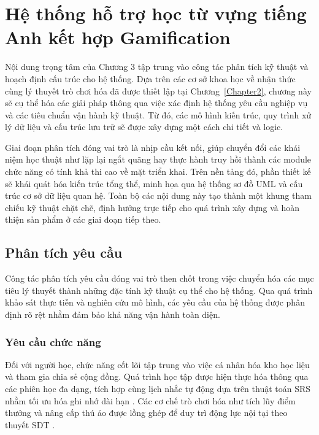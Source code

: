 ﻿\chapter{Hệ thống hỗ trợ học từ vựng tiếng Anh kết hợp Gamification}
\label{Chapter3}

Nội dung trọng tâm của Chương 3 tập trung vào công tác phân tích kỹ thuật và hoạch định cấu trúc cho hệ thống. Dựa trên các cơ sở khoa học về nhận thức cùng lý thuyết trò chơi hóa đã được thiết lập tại Chương~\ref{Chapter2}, chương này sẽ cụ thể hóa các giải pháp thông qua việc xác định hệ thống yêu cầu nghiệp vụ và các tiêu chuẩn vận hành kỹ thuật. Từ đó, các mô hình kiến trúc, quy trình xử lý dữ liệu và cấu trúc lưu trữ sẽ được xây dựng một cách chi tiết và logic.

Giai đoạn phân tích đóng vai trò là nhịp cầu kết nối, giúp chuyển đổi các khái niệm học thuật như lặp lại ngắt quãng hay thực hành truy hồi thành các module chức năng có tính khả thi cao về mặt triển khai. Trên nền tảng đó, phần thiết kế sẽ khái quát hóa kiến trúc tổng thể, minh họa qua hệ thống sơ đồ UML và cấu trúc cơ sở dữ liệu quan hệ. Toàn bộ các nội dung này tạo thành một khung tham chiếu kỹ thuật chặt chẽ, định hướng trực tiếp cho quá trình xây dựng và hoàn thiện sản phẩm ở các giai đoạn tiếp theo.

\section{Phân tích yêu cầu}

Công tác phân tích yêu cầu đóng vai trò then chốt trong việc chuyển hóa các mục tiêu lý thuyết thành những đặc tính kỹ thuật cụ thể cho hệ thống. Qua quá trình khảo sát thực tiễn và nghiên cứu mô hình, các yêu cầu của hệ thống được phân định rõ rệt nhằm đảm bảo khả năng vận hành toàn diện.

\subsection{Yêu cầu chức năng}

Đối với người học, chức năng cốt lõi tập trung vào việc cá nhân hóa kho học liệu và tham gia chia sẻ cộng đồng. Quá trình học tập được hiện thực hóa thông qua các phiên học đa dạng, tích hợp cùng lịch nhắc tự động dựa trên thuật toán SRS nhằm tối ưu hóa ghi nhớ dài hạn \cite{Cepeda2008}. Các cơ chế trò chơi hóa như tích lũy điểm thưởng và nâng cấp thú ảo được lồng ghép để duy trì động lực nội tại theo thuyết SDT \cite{RyanDeci2017}.

